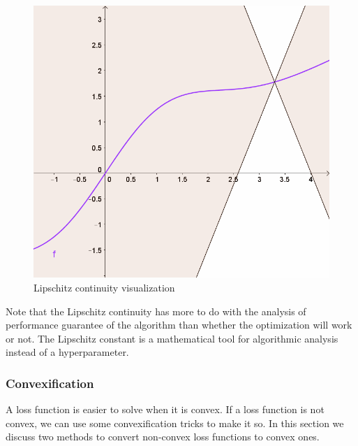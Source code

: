 \documentclass[11pt]{article}
\begin{document}
\begin{figure}[h]
\begin{minipage}{.33\textwidth}
    \includegraphics[width=.9\linewidth]{figure/lip_3.png}
\end{minipage}
\caption{Lipschitz continuity visualization \cite{wiki:lipschitz}}
\label{fig:lipschitz}
\end{figure}

Note that the Lipschitz continuity has more to do with the analysis of performance guarantee of the algorithm than whether the optimization will work or not. The Lipschitz constant is a mathematical tool for algorithmic analysis instead of a hyperparameter.

\subsubsection{Convexification}
A loss function is easier to solve when it is convex. If a loss function is not convex, we can use some convexification tricks to make it so. In this section we discuss two methods to convert non-convex loss functions to convex ones.
\end{document}
